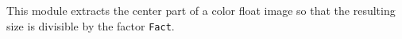 This module extracts the center part of a color float image
so that the resulting size is divisible by the factor \verb+Fact+.
